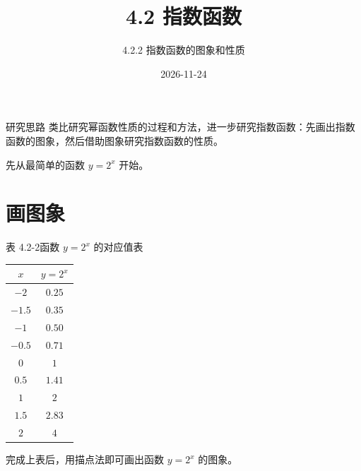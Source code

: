 \documentclass[aspectratio=169,11pt,t,fleqn]{ctexbeamer}
\title[指数函数的图象和性质]{4.2 指数函数}
\subtitle{4.2.2 指数函数的图象和性质}
\author[好好学习，努力向上]{}
\date{2026-11-24}
\begin{document}
\begin{frame}
  \titlepage
\end{frame}

\begin{frame}{研究思路}
  类比研究幂函数性质的过程和方法，进一步研究指数函数：\alert{先画出指数函数的图象，然后借助图象研究指数函数的性质}。

  \vspace{0.8em}
  先从最简单的函数 $y=2^x$ 开始。
\end{frame}

\section{画图象}
\begin{frame}{表 4.2-2\quad 函数 $y=2^x$ 的对应值表}
  \centering
  \renewcommand{\arraystretch}{1.2}
  \begin{tabular}{|c|c|}
    \hline
    \rowcolor{xyyg!60}
    \textbf{$x$} & \textbf{$y=2^x$} \\
    \hline
    $-2$    & $0.25$ \\
    \hline
    $-1.5$  & $0.35$ \\
    \hline
    $-1$    & $0.50$ \\
    \hline
    $-0.5$  & $0.71$ \\
    \hline
    $0$     & $1$ \\
    \hline
    $0.5$   & $1.41$ \\
    \hline
    $1$     & $2$ \\
    \hline
    $1.5$   & $2.83$ \\
    \hline
    $2$     & $4$ \\
    \hline
  \end{tabular}

  \vspace{0.6em}
  \small 完成上表后，用\alert{描点法}即可画出函数 $y=2^x$ 的图象。
\end{frame}
\end{document}
